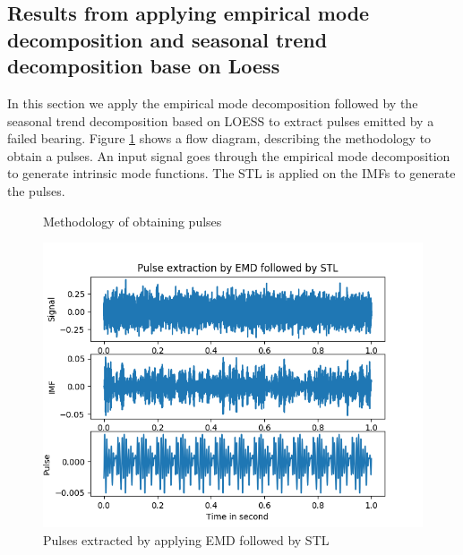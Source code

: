 \documentclass[../Main/thesis.tex]{subfiles}
\begin{document}
\subsection{Results from applying empirical mode decomposition and seasonal trend decomposition base on Loess}
In this section we apply the empirical mode decomposition followed by the seasonal trend decomposition based on LOESS to extract pulses emitted by a failed bearing.
Figure \ref{fig:pulse} shows a flow diagram, describing the methodology to obtain a pulses. An input signal goes through the empirical mode decomposition to generate intrinsic mode functions. 
The STL is applied on the IMFs to generate the pulses.
\begin{figure}[H]
  \caption{Methodology of obtaining pulses }
   \label{fig:pulse}
\end{figure}
\begin{figure}[H] %
   \centering
   \includegraphics[width=6in]{../fig/emd-stl.png} 
   \caption{Pulses extracted by applying EMD followed by STL}
   \label{fig:emd-stl}
\end{figure}

 







\blankpage
\end{document}
